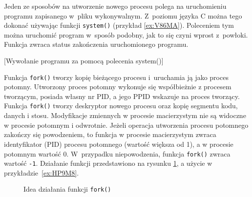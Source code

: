 Jeden ze sposobów na utworzenie nowego procesu polega na uruchomieniu programu
zapisanego w~pliku wykonywalnym. Z~poziomu języka C można tego dokonać używając
funkcji \texttt{system()} (przykład \ref{ex:V86MA}). Poleceniem tym można
uruchomić program w~sposób podobny, jak to się czyni wprost z~powłoki. Funkcja
zwraca status zakończenia uruchomionego programu.

\begin{example}{[Wywołanie programu za pomocą polecenia system()]}
  \label{ex:V86MA}
  
\end{example}

Funkcja \texttt{fork()} tworzy kopię bieżącego procesu i~uruchamia ją jako
proces potomny. Utworzony proces potomny wykonuje się współbieżnie z procesem
tworzącym, posiada własny nr PID, a jego PPID wskazuje na proces tworzący.
Funkcja \texttt{fork()} tworzy deskryptor nowego procesu oraz kopię segmentu
kodu, danych i stosu. Modyfikacje zmiennych w procesie macierzystym nie są
widoczne w procesie potomnym i odwrotnie. Jeżeli operacja utworzenia procesu
potomnego zakończy się powodzeniem, to funkcja w procesie macierzystym zwraca
identyfikator (PID) procesu potomnego (wartość większa od 1), a w procesie
potomnym wartość 0. W~przypadku niepowodzenia, funkcja \texttt{fork()} zwraca
wartość \texttt{-1}. Działanie funkcji przedstawiono na rysunku
\ref{fig:S278F}, a użycie w przykładzie~\ref{ex:HP9M8}.

\begin{figure}
  \centering
  \caption{Idea działania funkcji \texttt{fork()}}
  \label{fig:S278F}
\end{figure}


